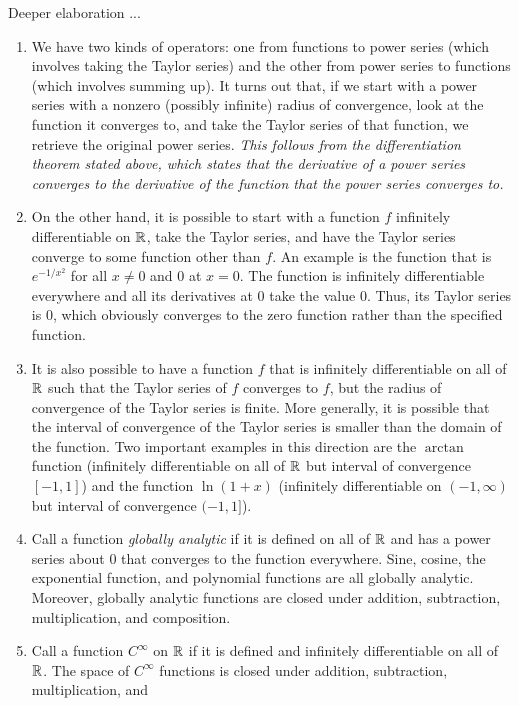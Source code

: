 \documentclass{amsart}
\begin{document}
Deeper elaboration ...

\begin{enumerate}
\item We have two kinds of operators: one from functions to power
  series (which involves taking the Taylor series) and the other from
  power series to functions (which involves summing up). It turns out
  that, if we start with a power series with a nonzero (possibly
  infinite) radius of convergence, look at the function it converges
  to, and take the Taylor series of that function, we retrieve the
  original power series. {\em This follows from the differentiation
  theorem stated above, which states that the derivative of a power
  series converges to the derivative of the function that the power
  series converges to.}
\item On the other hand, it is possible to start with a function $f$
  infinitely differentiable on $\mathbb{R}$, take the Taylor series, and have
  the Taylor series converge to some function other than $f$. An
  example is the function that is $e^{-1/x^2}$ for all $x \ne 0$ and
  $0$ at $x = 0$. The function is infinitely differentiable everywhere
  and all its derivatives at $0$ take the value $0$. Thus, its Taylor
  series is $0$, which obviously converges to the zero function rather
  than the specified function.
\item It is also possible to have a function $f$ that is infinitely
  differentiable on all of $\mathbb{R}$ such that the Taylor series of $f$
  converges to $f$, but the radius of convergence of the Taylor series
  is finite. More generally, it is possible that the interval of
  convergence of the Taylor series is smaller than the domain of the
  function. Two important examples in this direction are the $\arctan$
  function (infinitely differentiable on all of $\mathbb{R}$ but interval of
  convergence $[-1,1]$) and the function $\ln(1 + x)$ (infinitely
  differentiable on $(-1,\infty)$ but interval of convergence $(-1,1]$).
\item Call a function {\em globally analytic} if it is defined on all
  of $\mathbb{R}$ and has a power series about $0$ that converges to the
  function everywhere. Sine, cosine, the exponential function, and
  polynomial functions are all globally analytic. Moreover, globally
  analytic functions are closed under addition, subtraction,
  multiplication, and composition.
\item Call a function $C^\infty$ on $\mathbb{R}$ if it is defined and
  infinitely differentiable on all of $\mathbb{R}$. The space of $C^\infty$
  functions is closed under addition, subtraction, multiplication, and

\end{enumerate}
\end{document}
